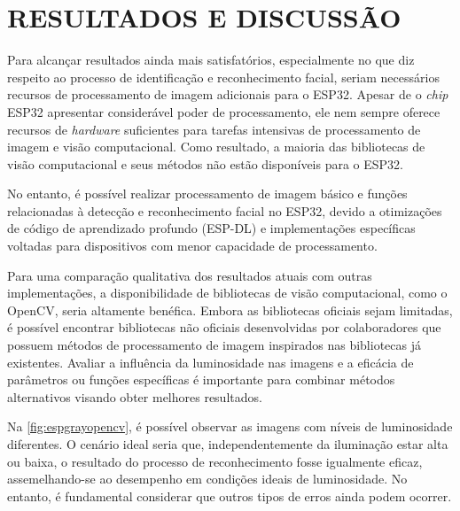 
\chapter{RESULTADOS E DISCUSSÃO}\label{cap:resultados}

Para alcançar resultados ainda mais satisfatórios, especialmente no que diz respeito 
ao processo de identificação e reconhecimento facial, seriam necessários recursos 
de processamento de imagem adicionais para o ESP32. Apesar de o \textit{chip} ESP32 
apresentar considerável poder de processamento, ele nem sempre oferece recursos 
de \textit{hardware} suficientes para tarefas intensivas de processamento de 
imagem e visão computacional. Como resultado, a maioria das bibliotecas de 
visão computacional e seus métodos não estão disponíveis para o ESP32.

No entanto, é possível realizar processamento de imagem básico e funções 
relacionadas à detecção e reconhecimento facial no ESP32, devido a 
otimizações de código de aprendizado profundo (ESP-DL) e implementações 
específicas voltadas para dispositivos com menor capacidade de processamento.

Para uma comparação qualitativa dos resultados atuais com outras implementações, 
a disponibilidade de bibliotecas de visão computacional, como o OpenCV, 
seria altamente benéfica. Embora as bibliotecas oficiais sejam limitadas, 
é possível encontrar bibliotecas não oficiais desenvolvidas por colaboradores 
que possuem métodos de processamento de imagem inspirados nas bibliotecas 
já existentes. Avaliar a influência da luminosidade nas imagens e a eficácia 
de parâmetros ou funções específicas é importante para combinar métodos 
alternativos visando obter melhores resultados.

Na \autoref{fig:espgrayopencv}, é possível observar as imagens com níveis 
de luminosidade diferentes. O cenário ideal seria que, independentemente 
da iluminação estar alta ou baixa, o resultado do processo de reconhecimento 
fosse igualmente eficaz, assemelhando-se ao desempenho em condições 
ideais de luminosidade. No entanto, 
é fundamental considerar que outros tipos de erros 
ainda podem ocorrer.

